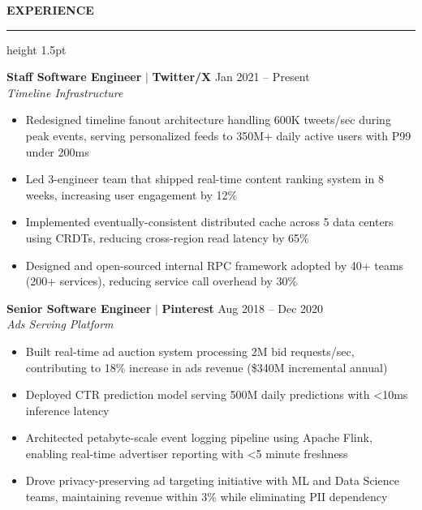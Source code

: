 \documentclass[10pt,letterpaper]{article}
\begin{document}
\hfill
\begin{minipage}[t]{0.65\textwidth}
\vspace{12pt}
\hspace{8pt}\begin{minipage}{\dimexpr\textwidth-16pt}

{\color{sidebar}\large\bfseries EXPERIENCE}\\[-2pt]
{\color{accent}\hrule height 1.5pt}\vspace{6pt}

\textbf{Staff Software Engineer} $\mid$ \textbf{Twitter/X} \hfill {\small Jan 2021 -- Present}\\
{\small\itshape Timeline Infrastructure}
\begin{itemize}
    \item Redesigned timeline fanout architecture handling 600K tweets/sec during peak events, serving personalized feeds to 350M+ daily active users with P99 under 200ms
    \item Led 3-engineer team that shipped real-time content ranking system in 8 weeks, increasing user engagement by 12\%
    \item Implemented eventually-consistent distributed cache across 5 data centers using CRDTs, reducing cross-region read latency by 65\%
    \item Designed and open-sourced internal RPC framework adopted by 40+ teams (200+ services), reducing service call overhead by 30\%
\end{itemize}

\vspace{6pt}
\textbf{Senior Software Engineer} $\mid$ \textbf{Pinterest} \hfill {\small Aug 2018 -- Dec 2020}\\
{\small\itshape Ads Serving Platform}
\begin{itemize}
    \item Built real-time ad auction system processing 2M bid requests/sec, contributing to 18\% increase in ads revenue (\$340M incremental annual)
    \item Deployed CTR prediction model serving 500M daily predictions with <10ms inference latency
    \item Architected petabyte-scale event logging pipeline using Apache Flink, enabling real-time advertiser reporting with <5 minute freshness
    \item Drove privacy-preserving ad targeting initiative with ML and Data Science teams, maintaining revenue within 3\% while eliminating PII dependency
\end{itemize}


\end{minipage}
\end{minipage}
\end{document}
